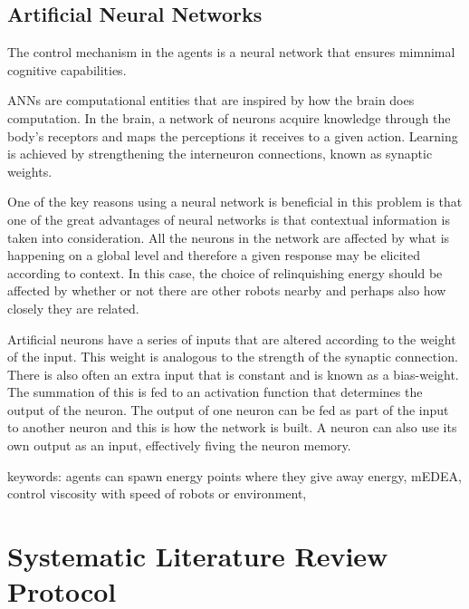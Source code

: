 \documentclass[a4paper]{book}
\begin{document}
\section{Artificial Neural Networks}

The control mechanism in the agents is a neural network that ensures mimnimal cognitive capabilities.

ANNs are computational entities that are inspired by how the brain does computation. 
In the brain, a network of neurons acquire knowledge through the body's receptors and maps the perceptions it receives to a given action. 
Learning is achieved by strengthening the interneuron connections, known as synaptic weights. \cite{haykin_neural_1994} 

One of the key reasons using a neural network is beneficial in this problem is that one of the great advantages of neural networks is that contextual information is taken into consideration. 
All the neurons in the network are affected by what is happening on a global level and therefore a given response may be elicited according to context.
In this case, the choice of relinquishing energy should be affected by whether or not there are other robots nearby and perhaps also how closely they are related.

Artificial neurons have a series of inputs that are altered according to the weight of the input. This weight is analogous to the strength of the synaptic connection.
There is also often an extra input that is constant and is known as a bias-weight. The summation of this is fed to an activation function that determines the output of the neuron. The output of one neuron can be fed as part of the input to another neuron and this is how the network is built. A neuron can also use its own output as an input, effectively fiving the neuron memory. 


keywords: agents can spawn energy points where they give away energy, mEDEA, control viscosity with speed of robots or environment, 



\chapter{Systematic Literature Review Protocol}\label{T-B}
\label{cha:STL}
\end{document}
